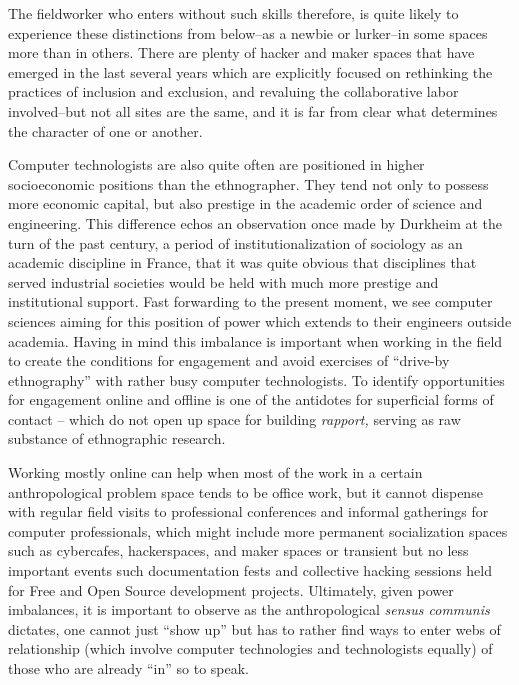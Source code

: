 \documentclass[10pt,letter,oneside]{scrartcl}
\begin{document}
  The fieldworker who enters without such skills therefore, is quite
  likely to experience these distinctions from below--as a newbie or
  lurker--in some spaces more than in others.  There are plenty of
  hacker and maker spaces that have emerged in the last several years
  which are explicitly focused on rethinking the practices of
  inclusion and exclusion, and revaluing the collaborative labor
  involved--but not all sites are the same, and it is far from clear
  what determines the character of one or another.  

  Computer technologists are also quite often are positioned in higher
  socioeconomic positions than the ethnographer. They tend not only to
  possess more economic capital, but also prestige in the academic
  order of science and engineering. This difference echos an
  observation once made by Durkheim at the turn of the past century, a
  period of institutionalization of sociology as an academic
  discipline in France, that it was quite obvious that disciplines
  that served industrial societies would be held with much more
  prestige and institutional support. Fast forwarding to the present
  moment, we see computer sciences aiming for this position of power
  which extends to their engineers outside academia. Having in mind
  this imbalance is important when working in the field to create the
  conditions for engagement and avoid exercises of ``drive-by
  ethnography'' with rather busy computer technologists. To identify
  opportunities for engagement online and offline is one of the
  antidotes for superficial forms of contact -- which do not open up
  space for building \emph{rapport,} serving as raw substance of
  ethnographic research.  %

  Working mostly online can help when most of the work in a certain
  anthropological problem space tends to be office work, but it cannot
  dispense with regular field visits to professional conferences and
  informal gatherings for computer professionals, which might include
  more permanent socialization spaces such as cybercafes,
  hackerspaces, and maker spaces or transient but no less important
  events such documentation fests and collective hacking sessions held
  for Free and Open Source development projects. Ultimately, given
  power imbalances, it is important to observe as the anthropological
  \emph{sensus communis} dictates, one cannot just ``show up'' but has
  to rather find ways to enter webs of relationship (which involve
  computer technologies and technologists equally) of those who are
  already ``in'' so to speak.
\end{document}
